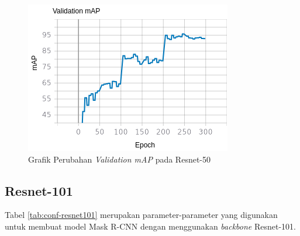 \begin{figure}[H]
	\centering
	\includegraphics[scale=0.4]{gambar/resnet50-map.png}
	\caption{Grafik Perubahan \textit{Validation mAP} pada Resnet-50}
	\label{fig:resnet50-map}
\end{figure}

\subsection{Resnet-101}
\label{subsec:resnet101}

Tabel \ref{tab:conf-resnet101} merupakan parameter-parameter yang digunakan untuk membuat model Mask R-CNN dengan menggunakan \textit{backbone} Resnet-101.

